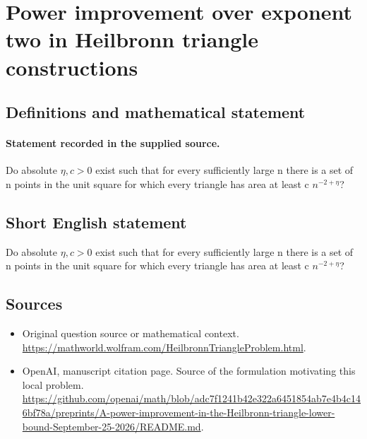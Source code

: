\documentclass[11pt]{article}
\begin{document}
\section*{Power improvement over exponent two in Heilbronn triangle constructions}\label{statement}
\subsection{Definitions and mathematical statement}
\paragraph{Statement recorded in the supplied source.}
Do absolute $\eta ,c>0$ exist such that for every sufficiently large n there is a set of n points in the unit square for which every triangle has area at least c $n^{-2+\eta }$?
\subsection{Short English statement}
Do absolute $\eta ,c>0$ exist such that for every sufficiently large n there is a set of n points in the unit square for which every triangle has area at least c $n^{-2+\eta }$?
\subsection{Sources}
\begin{itemize}
\item[S1] Original question source or mathematical context.
\url{https://mathworld.wolfram.com/HeilbronnTriangleProblem.html}.
\item[S2] OpenAI, manuscript citation page. Source of the formulation motivating this local problem.
\url{https://github.com/openai/math/blob/adc7f1241b42e322a6451854ab7e4b4c146bf78a/preprints/A-power-improvement-in-the-Heilbronn-triangle-lower-bound-September-25-2026/README.md}.
\end{itemize}
\end{document}
